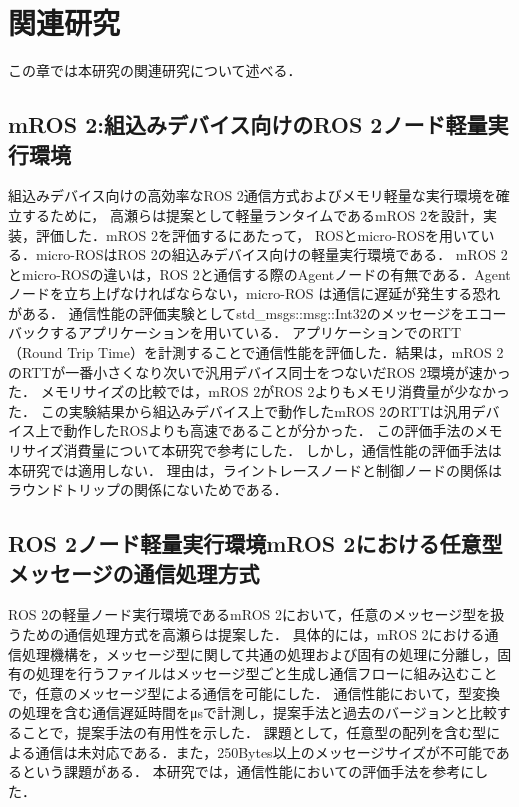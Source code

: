 \chapter{関連研究}
この章では本研究の関連研究について述べる．
\section{mROS 2:組込みデバイス向けのROS 2ノード軽量実行環境}
組込みデバイス向けの高効率なROS 2通信方式およびメモリ軽量な実行環境を確立するために，
高瀬らは提案として軽量ランタイムであるmROS 2を設計，実装，評価した．mROS 2を評価するにあたって，
ROSとmicro-ROSを用いている．micro-ROSはROS 2の組込みデバイス向けの軽量実行環境である．
mROS 2とmicro-ROSの違いは，ROS 2と通信する際のAgentノードの有無である．Agentノードを立ち上げなければならない，micro-ROS は通信に遅延が発生する恐れがある．
通信性能の評価実験としてstd\_msgs::msg::Int32のメッセージをエコーバックするアプリケーションを用いている．
アプリケーションでのRTT（Round Trip Time）を計測することで通信性能を評価した．結果は，mROS 2のRTTが一番小さくなり次いで汎用デバイス同士をつないだROS 2環境が速かった．
メモリサイズの比較では，mROS 2がROS 2よりもメモリ消費量が少なかった．
この実験結果から組込みデバイス上で動作したmROS 2のRTTは汎用デバイス上で動作したROSよりも高速であることが分かった．
この評価手法のメモリサイズ消費量について本研究で参考にした．
しかし，通信性能の評価手法は本研究では適用しない．
理由は，ライントレースノードと制御ノードの関係はラウンドトリップの関係にないためである．
\section{ROS 2ノード軽量実行環境mROS 2における任意型メッセージの通信処理方式}
ROS 2の軽量ノード実行環境であるmROS 2において，任意のメッセージ型を扱うための通信処理方式を高瀬らは提案した．
具体的には，mROS 2における通信処理機構を，メッセージ型に関して共通の処理および固有の処理に分離し，固有の処理を行うファイルはメッセージ型ごと生成し通信フローに組み込むことで，任意のメッセージ型による通信を可能にした．
通信性能において，型変換の処理を含む通信遅延時間をμsで計測し，提案手法と過去のバージョンと比較することで，提案手法の有用性を示した．
課題として，任意型の配列を含む型による通信は未対応である．また，250Bytes以上のメッセージサイズが不可能であるという課題がある．
本研究では，通信性能においての評価手法を参考にした．